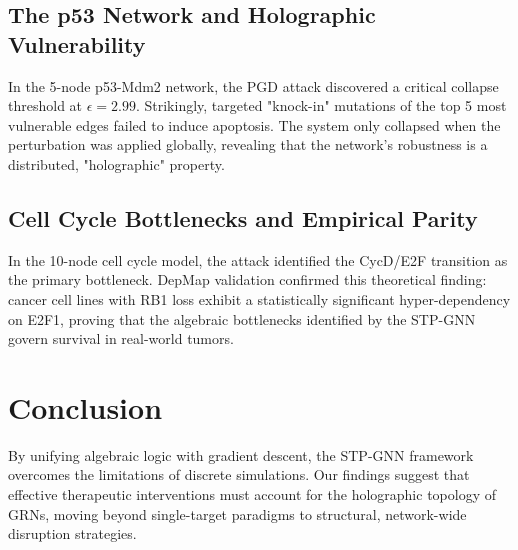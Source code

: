 \documentclass[11pt,a4paper]{article}
\begin{document}
\subsection{The p53 Network and Holographic Vulnerability}
In the 5-node p53-Mdm2 network, the PGD attack discovered a critical collapse threshold at $\epsilon = 2.99$. Strikingly, targeted "knock-in" mutations of the top 5 most vulnerable edges failed to induce apoptosis. The system only collapsed when the perturbation was applied globally, revealing that the network's robustness is a distributed, "holographic" property.

\subsection{Cell Cycle Bottlenecks and Empirical Parity}
In the 10-node cell cycle model, the attack identified the CycD/E2F transition as the primary bottleneck. DepMap validation confirmed this theoretical finding: cancer cell lines with RB1 loss exhibit a statistically significant hyper-dependency on E2F1, proving that the algebraic bottlenecks identified by the STP-GNN govern survival in real-world tumors.

\section{Conclusion}
By unifying algebraic logic with gradient descent, the STP-GNN framework overcomes the limitations of discrete simulations. Our findings suggest that effective therapeutic interventions must account for the holographic topology of GRNs, moving beyond single-target paradigms to structural, network-wide disruption strategies.
\end{document}
